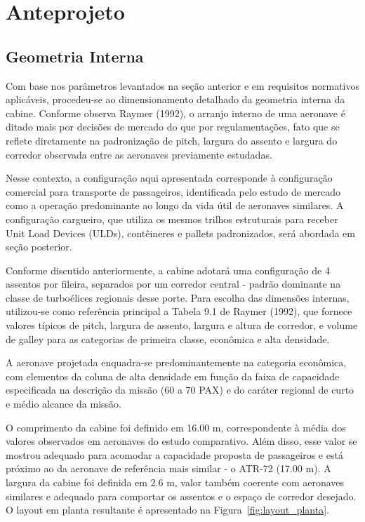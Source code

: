 \chapter{Anteprojeto}
\section{Geometria Interna}
Com base nos parâmetros levantados na seção anterior e em requisitos normativos aplicáveis, procedeu-se ao dimensionamento detalhado da geometria interna da cabine. Conforme observa Raymer (1992), o arranjo interno de uma aeronave é ditado mais por decisões de mercado do que por regulamentações, fato que se reflete diretamente na padronização de pitch, largura do assento e largura do corredor observada entre as aeronaves previamente estudadas.

Nesse contexto, a configuração aqui apresentada corresponde à configuração comercial para transporte de passageiros, identificada pelo estudo de mercado como a operação predominante ao longo da vida útil de aeronaves similares. A configuração cargueiro, que utiliza os mesmos trilhos estruturais para receber Unit Load Devices (ULDs), contêineres e pallets padronizados, será abordada em seção posterior.

Conforme discutido anteriormente, a cabine adotará uma configuração de 4 assentos por fileira, separados por um corredor central - padrão dominante na classe de turboélices regionais desse porte. Para escolha das dimensões internas, utilizou-se como referência principal a Tabela 9.1 de Raymer (1992), que fornece valores típicos de pitch, largura de assento, largura e altura de corredor, e volume de galley para as categorias de primeira classe, econômica e alta densidade.

A aeronave projetada enquadra-se predominantemente na categoria econômica, com elementos da coluna de alta densidade em função da faixa de capacidade especificada na descrição da missão (60 a 70 PAX) e do caráter regional de curto e médio alcance da missão.

O comprimento da cabine foi definido em 16.00 m, correspondente à média dos valores observados em aeronaves do estudo comparativo. Além disso, esse valor se mostrou adequado para acomodar a capacidade proposta de passageiros e está próximo ao da aeronave de referência mais similar - o ATR-72 (17.00 m). A largura da cabine foi definida em 2.6 m, valor também coerente com aeronaves similares e adequado para comportar os assentos e o espaço de corredor desejado. O layout em planta resultante é apresentado na Figura~\ref{fig:layout_planta}.

